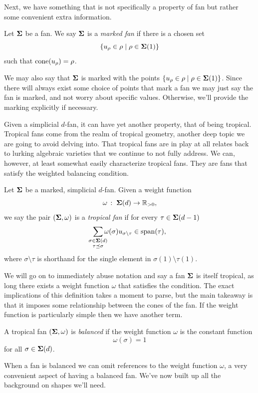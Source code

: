 \documentclass[12pt,oneside]{../../sfsuthesis}
\begin{document}
Next, we have something that is not specifically a property of fan but rather some convenient extra information.
\begin{definition}\th\label{marked}
    Let \( \bm{\Sigma} \) be a fan.
    We say \( \bm{\Sigma} \) is a \emph{marked fan} if there is a chosen set
    \[
        \left\{ u_\rho \in \rho \; \middle| \; \rho \in \bm{\Sigma}(1) \right\}
    \]
    such that \( \mathrm{cone}(u_\rho) = \rho \).
\end{definition}
We may also say that \( \bm{\Sigma} \) is marked with the points \(  \left\{ u_\rho \in \rho \; \middle| \; \rho \in \bm{\Sigma}(1) \right\} \).
Since there will always exist some choice of points that mark a fan we may just say the fan is marked, and not worry about specific values.
Otherwise, we'll provide the marking explicitly if necessary.

Given a simplicial \( d \)-fan, it can have yet another property, that of being tropical.
Tropical fans come from the realm of tropical geometry, another deep topic we are going to avoid delving into.
That tropical fans are in play at all relates back to lurking algebraic varieties that we continue to not fully address.
We can, however, at least somewhat easily characterize tropical fans.
They are fans that satisfy the weighted balancing condition.
\begin{definition}\th\label{def:tropical}
    Let \( \bm{\Sigma} \) be a marked, simplicial \( d \)-fan.
    Given a weight function
    \[
        \omega\,:\; \bm{\Sigma}(d) \to \mathbb{R}_{>0},
    \]
    we say the pair \( (\bm{\Sigma}, \omega) \) is a \emph{tropical fan} if for every \( \tau \in \bm{\Sigma}(d-1) \)
    \[
        \sum_{\mathclap{\substack{\sigma \in \bSigma(d) \\ \tau \preceq \sigma}}} \omega(\sigma) u_{\sigma \setminus \tau} \in \Span(\tau),
    \]
    where \( \sigma \setminus \tau \) is shorthand for the single element in \( \sigma(1) \setminus \tau(1) \).
\end{definition}
We will go on to immediately abuse notation and say a fan \( \bm{\Sigma} \) is itself tropical, as long there exists a weight function \( \omega \) that satisfies the condition.
The exact implications of this definition takes a moment to parse, but the main takeaway is that it imposes some relationship between the cones of the fan.
If the weight function is particularly simple then we have another term.
\begin{definition}\th\label{def:balanced}
    A tropical fan \( (\bm{\Sigma}, \omega) \) is \emph{balanced} if the weight function \( \omega \) is the constant function
    \[
        \omega(\sigma) = 1
    \]
    for all \( \sigma \in \bm{\Sigma}(d) \).
\end{definition}
When a fan is balanced we can omit references to the weight function \( \omega \), a very convenient aspect of having a balanced fan.
We've now built up all the background on shapes we'll need.
\end{document}
